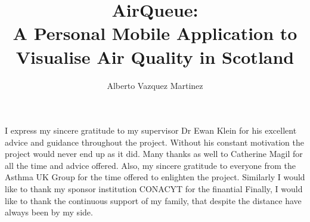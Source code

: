 \documentclass[bsc,logo, abbrevs]{infthesis}
\title{AirQueue: \protect\\ A Personal Mobile Application to Visualise Air Quality in Scotland}
\author{Alberto Vazquez Martinez}
\begin{document}
\begin{preliminary}

\maketitle
\begin{acknowledgements}

I express my sincere gratitude to my supervisor Dr Ewan Klein for his excellent advice and guidance throughout the project. Without his constant motivation the project would never end up as it did.
Many thanks as well to Catherine Magil for all the time and advice offered. Also, my sincere gratitude to everyone from the Asthma UK Group for the time offered to enlighten the project. Similarly I would like to thank my sponsor institution CONACYT for the finantial 
Finally, I would like to thank the continuous support of my family, that despite the distance have always been by my side.

\end{acknowledgements}

\standarddeclaration

\tableofcontents
\listoffigures
\iffalse
\listoftables
\begin{accron}\end{accron}
\fi
\end{preliminary}













\appendix

\end{document}
